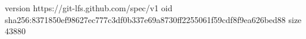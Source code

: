 version https://git-lfs.github.com/spec/v1
oid sha256:8371850ef98627ec777c3df0b337e69a8730ff2255061f59cdf8f9ea626bed88
size 43880
